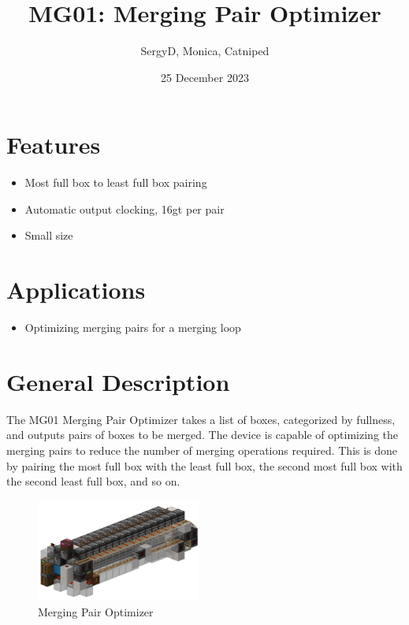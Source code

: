 \documentclass[10pt]{datasheet}
\title{MG01: Merging Pair Optimizer}
\author{SergyD, Monica, Catniped}
\date{25 December 2023}
\begin{document}
\maketitle

\section{Features}

\begin{itemize}
\item{Most full box to least full box pairing}
\item{Automatic output clocking, 16gt per pair}
\item{Small size}
\end{itemize}

\section{Applications}

\begin{itemize}
\item{Optimizing merging pairs for a merging loop}
\end{itemize}

\section{General Description}
The MG01 Merging Pair Optimizer takes a list of boxes, categorized by fullness, and outputs pairs of boxes to be merged. The device is capable of optimizing the merging pairs to reduce the number of merging operations required. This is done by pairing the most full box with the least full box, the second most full box with the second least full box, and so on.

\vfill\break

\begin{figure}[h]
    \centering
    \includegraphics[width=0.48\textwidth]{area_render_56.png}
    \caption{\centering Merging Pair Optimizer}
\end{figure}
\end{document}
